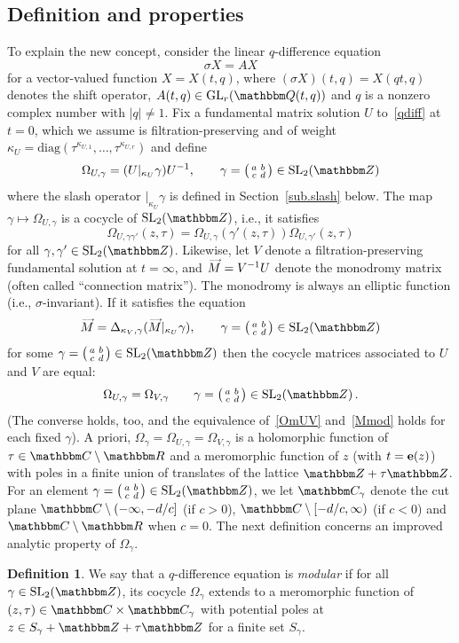 \documentclass[12pt,reqno]{amsart}
\theoremstyle{definition}
\newtheorem{definition}[theorem]{Definition}
\def\BZ{\mathbbm Z}
\def\BQ{\mathbbm Q}
\def\BR{\mathbbm R}
\def\BC{\mathbbm C}
\def\s{\sigma}
\def\SL{\mathrm{SL}}
\def\be{\begin{equation}}
\def\ee{\end{equation}}
\def\GL{\mathrm{GL}}
\def\e{\bold e}
\def\diag{\mathrm{diag}}
\def\Om{\Omega}
\def\sma#1#2#3#4{\bigl(\smallmatrix#1&#2\\#3&#4\endsmallmatrix\bigr)} %
\def\vM{\accentset{\longrightarrow}{M}}
\begin{document}
\subsection{Definition and properties}
\label{sub.def}

To explain the new concept, consider the linear $q$-difference equation
\be
\label{qdiff}
\s X = A X
\ee
for a vector-valued function $X=X(t,q)$, where $(\s X)(t,q)=X(qt,q)$ denotes the
shift operator, $A(t,q) \in \GL_r(\BQ(t,q))$ and $q$ is a nonzero complex number
with $|q|\neq1$. 
Fix a fundamental matrix solution $U$ to~\eqref{qdiff} at $t=0$, which we assume
is filtration-preserving and of weight $\kappa_{U}=\diag(\tau^{\kappa_{U,1}},\dots,
\tau^{\kappa_{U,r}})$ and define 
\be
\label{Om}
\Om_{U,\gamma} =(U|_{\kappa_{U}}\gamma)U^{-1},
\qquad \gamma=\sma abcd \in \SL_2(\BZ)
\ee
where the slash operator $|_{\kappa_{U}}\gamma$ is defined in Section~\ref{sub.slash}
below. The map $\gamma \mapsto \Om_{U,\gamma}$ is a cocycle of $\SL_2(\BZ)$, i.e.,
it satisfies
\be
\label{Omcoc}
\Om_{U,\gamma \gamma'}(z,\tau)
= \Om_{U,\gamma}(\gamma'(z,\tau))  \Om_{U,\gamma'}(z,\tau) 
\ee
for all $\gamma, \gamma' \in \SL_2(\BZ)$.
Likewise, let $V$ denote a filtration-preserving fundamental solution at $t=\infty$,
and $\vM=V^{-1}U$ denote the monodromy matrix (often called ``connection matrix'').
The monodromy is always an elliptic function (i.e., $\s$-invariant).
If it satisfies the equation
\be
\label{Mmod}
\vM = \Delta_{\kappa_V,\gamma} (\vM|_{\kappa_U} \gamma),
\qquad \gamma=\sma abcd \in \SL_2(\BZ)
\ee
for some $\gamma=\sma abcd \in \SL_2(\BZ)$ then the cocycle matrices associated to
$U$ and $V$ are equal: 
\be
\label{OmUV}
\Om_{U,\gamma} = \Om_{V,\gamma} \qquad \gamma=\sma abcd \in \SL_2(\BZ) \,.
\ee
(The converse holds, too, and the equivalence of~\eqref{OmUV} and~\eqref{Mmod}
holds for each fixed $\gamma$). A priori, $\Om_{\gamma}=\Om_{U,\gamma}=\Om_{V,\gamma}$
is a holomorphic function of $\tau \in \BC\setminus\BR$ and a
meromorphic function of $z$ (with $t=\e(z)$) with poles in a finite union of
translates of the lattice $\BZ+\tau\BZ$. For an element
$\gamma=\sma abcd \in \SL_2(\BZ)$, we let $\BC_\gamma$ denote the cut
plane $\BC\setminus (-\infty,-d/c]$ (if $c>0$),
$\BC\setminus [-d/c,\infty)$ (if $c<0$) and $\BC\setminus\BR$ when $c=0$. 
The next definition concerns an improved analytic property of $\Om_{\gamma}$.
\begin{definition}
  \label{def.qmm}
  We say that a $q$-difference equation is \emph{modular} if for all $\gamma
  \in \SL_2(\BZ)$, its cocycle $\Om_{\gamma}$ extends to a meromorphic function
  of $(z,\tau)\in\BC\times\BC_\gamma$ with potential poles at
  $z \in S_\gamma + \BZ + \tau \BZ$ for a finite set $S_\gamma$. 
\end{definition}
\end{document}
